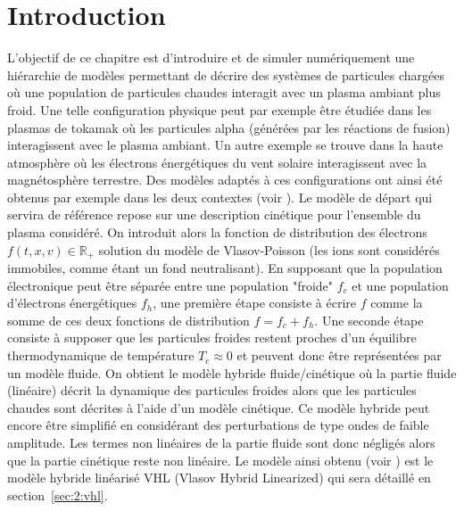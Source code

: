 
\section{Introduction}
L'objectif de ce chapitre est d'introduire et de simuler numériquement une hiérarchie de modèles permettant de décrire des systèmes de particules chargées où une population de particules chaudes interagit avec un plasma ambiant plus froid. Une telle configuration physique peut par exemple être étudiée dans les plasmas de tokamak où les particules alpha (générées par les réactions de fusion) interagissent avec le plasma ambiant. Un autre exemple se trouve dans la haute atmosphère  où les électrons énergétiques du vent solaire interagissent avec la magnétosphère terrestre. Des modèles adaptés à ces configurations ont ainsi été obtenus par exemple dans les deux contextes (voir \cite{Holderied:2019} \cite{Chen:2016} \cite{Katoh:2007} \cite{Tao:2014} \cite{Tronci:2010} \cite{Tronci:2014}). Le modèle de départ qui servira de référence repose sur une description cinétique pour l'ensemble du plasma considéré. On introduit alors la fonction de distribution des électrons  $f(t,x,v)\in\mathbb{R}_+$ solution du modèle de Vlasov-Poisson (les ions sont considérés immobiles, comme étant un fond neutralisant). En supposant que la population électronique peut être séparée entre une population "froide" $f_c$ et une population d'électrons énergétiques $f_h$, une première étape consiste à écrire $f$ comme la somme de ces deux fonctions de distribution $f=f_c+f_h$. Une seconde étape consiste à supposer que les particules froides restent proches d'un équilibre thermodynamique de température $T_c\approx 0$ et peuvent donc être représentées par un modèle fluide. On obtient le modèle hybride fluide/cinétique où la partie fluide (linéaire) décrit la dynamique des particules froides alors que les particules chaudes sont décrites à l'aide d'un modèle cinétique. Ce modèle hybride peut encore être simplifié en considérant des perturbations de type ondes de faible amplitude. Les termes non linéaires de la partie fluide sont donc négligés alors que la partie cinétique reste non linéaire. Le modèle ainsi obtenu (voir \cite{Holderied:2019}) est le modèle hybride linéarisé VHL (Vlasov Hybrid Linearized) qui sera détaillé en section~\ref{sec:2:vhl}.


